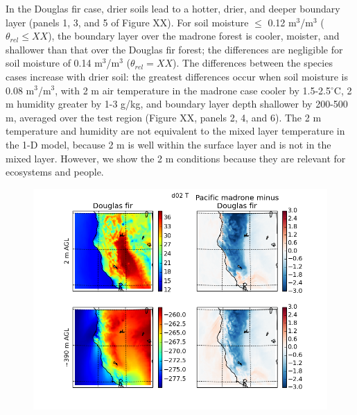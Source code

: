 In the Douglas fir case, drier soils lead to a hotter, drier, and deeper boundary layer (panels 1, 3, and 5 of Figure XX).  For soil moisture $\le$ 0.12 m$^3$/m$^3$ ($\theta_{rel} \le XX$), the boundary layer over the madrone forest is cooler, moister, and shallower than that over the Douglas fir forest; the differences are negligible for soil moisture of 0.14 m$^3$/m$^3$ ($\theta_{rel} = XX$).  The differences between the species cases increase with drier soil: the greatest differences occur when soil moisture is 0.08 m$^3$/m$^3$, with 2 m air temperature in the madrone case cooler by 1.5-2.5$^\circ$C, 2 m humidity greater by 1-3 g/kg, and boundary layer depth shallower by 200-500 m, averaged over the test region (Figure XX, panels 2, 4, and 6).  The 2 m temperature and humidity are not equivalent to the mixed layer temperature in the 1-D model, because 2 m is well within the surface layer and is not in the mixed layer.  However, we show the 2 m conditions because they are relevant for ecosystems and people.

\begin{figure}[here]
\includegraphics[width=1\textwidth]{ch2-BL/figures/T_d02_s0pt08.png}
\caption{}
\label{fig:BL_WRFmapT}
\end{figure}

